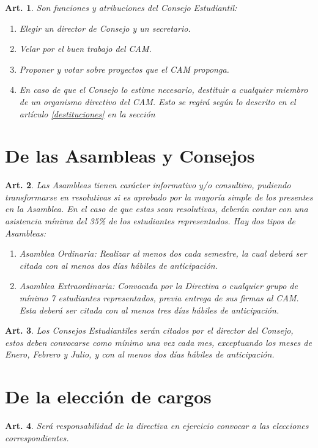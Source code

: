 \documentclass[letterpaper,11pt]{article}
\theoremstyle{plain}
\newtheorem{art}{Art.} %
\begin{document}
\begin{art}\label{funcionesConsejoEstudiantil}
	Son funciones  y atribuciones del Consejo Estudiantil:
	\begin{enumerate}
		\item Elegir un director de Consejo y un secretario.
		\item Velar por el buen trabajo del CAM.
		\item Proponer y votar sobre proyectos que el CAM proponga.
		\item En caso de que el Consejo lo estime necesario, destituir a cualquier miembro de un organismo directivo del CAM. Esto se regirá según lo descrito en el artículo \ref{destituciones} en la sección 
	\end{enumerate}
\end{art}

\section{De las Asambleas y Consejos}\label{asambleasConsejos}
\begin{art}\label{asambleas}
	Las Asambleas tienen carácter informativo y/o consultivo, pudiendo transformarse en resolutivas si es aprobado por la mayoría simple de los presentes en la Asamblea. En el caso de que estas sean resolutivas, deberán contar con una asistencia mínima del 35\% de los estudiantes representados. Hay dos tipos de Asambleas:
	\begin{enumerate}
		\item Asamblea Ordinaria: Realizar al menos dos cada semestre, la cual deberá ser citada con al menos dos días hábiles de anticipación.
		\item Asamblea Extraordinaria: Convocada por la Directiva o cualquier grupo de mínimo 7 estudiantes representados, previa entrega de sus firmas al CAM. Esta deberá ser citada con al menos tres días hábiles de anticipación.%
	\end{enumerate}
\end{art}

\begin{art}\label{consejos}
	Los Consejos Estudiantiles serán citados por el director del Consejo, estos deben convocarse como mínimo una vez cada mes, exceptuando los meses de Enero, Febrero y Julio, y con al menos dos días hábiles de anticipación.
\end{art}

\section{De la elección de cargos}\label{elecciones}
\begin{art}\label{eleccionesConvocación}
	Será responsabilidad de la directiva en ejercicio convocar a las elecciones correspondientes.
\end{art}
\end{document}
